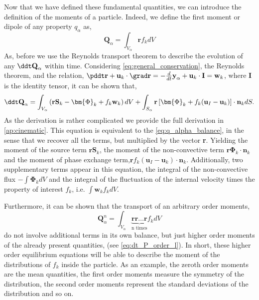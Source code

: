 Now that we have defined these fundamental quantities, we can introduce the definition of the moments of a particle.
Indeed, we define the first moment or dipole of any property $q_\alpha$ as,
\begin{equation*}
    \textbf{Q}_\alpha 
    = \int_{V_\alpha} \textbf{r} f_k dV
\end{equation*}
As, before we use the Reynolds transport theorem to describe the evolution of any $\ddt \textbf{Q}_\alpha$ within time. 
Considering \ref{eq:general_conservation}, the Reynolds theorem, and the relation,
$  \pddt \textbf{r}
+ \textbf{u}_k \cdot \grad \textbf{r}
= - \frac{d}{dt} \textbf{y}_\alpha  + \textbf{u}_k \cdot \textbf{I}
= \textbf{w}_k$,
where $\textbf{I}$ is the identity tensor, it can be shown that, 
\begin{align}
    \ddt \textbf{Q}_\alpha
    = \int_{V_\alpha} \left( 
        \textbf{r} \textbf{S}_k 
        - \bm{\Phi}_k
        + f_k  \textbf{w}_k 
    \right) dV
    + \int_{S_\alpha} \textbf{r} \left[
        \bm{\Phi}_k
        + f_k (\textbf{u}_I-\textbf{u}_k)
    \right]\cdot \textbf{n}_k  dS.
    \label{eq:dt_Q_alpha}
\end{align}
As the derivation is rather complicated we provide the full derivation in \ref{ap:cinematic}. 
This equation is equivalent to the \ref{eq:q_alpha_balance}, in the sense that we recover all the terms, but multiplied by the vector \textbf{r}.
Yielding the moment of the source term $\textbf{rS}_k$, the moment of the non-convective term $\textbf{r}\mathbf{\Phi}_k\cdot\textbf{n}_k$ and the moment of phase exchange term,$\textbf{r} f_k (\textbf{u}_I-\textbf{u}_k)\cdot\textbf{n}_k$. 
Additionally, two supplementary terms appear in this equation, the integral of the non-convective flux $- \int \bm{\Phi}_k dV$ and the integral of the fluctuation of the internal velocity times the property of interest $f_k$, i.e. $\int \textbf{w}_k f_k dV$. 
 
Furthermore, it can be shown that the transport of an arbitrary order moments,
\begin{equation*}
    \textbf{Q}_\alpha^n
    = \int_{V_\alpha} \underbrace{
        \textbf{r}\textbf{r}\ldots\textbf{r}
    }_{
        \text{n times}
    }
    f_k dV
\end{equation*} 
do not involve additional terms in its own balance, but just higher order moments of the already present quantities, (see \ref{eq:dt_P_order_l}).
In short, these higher order equilibrium equations will be able to describe the moment of the distributions of $f_k$ inside the particle.
As an example, the zeroth order moments are the mean quantities, the first order moments measure the symmetry of the distribution, the second order moments represent the standard deviations of the distribution and so on.


